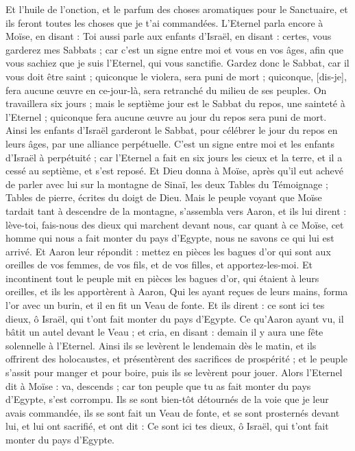 \begin{multicols}{2}
Et l'huile de l'onction, et le parfum des choses aromatiques pour le Sanctuaire, et ils feront toutes les choses que je t'ai commandées.
L'Eternel parla encore à Moïse, en disant :
Toi aussi parle aux enfants d'Israël, en disant : certes, vous garderez mes Sabbats ; car c'est un signe entre moi et vous en vos âges, afin que vous sachiez que je suis l'Eternel, qui vous sanctifie.
Gardez donc le Sabbat, car il vous doit être saint ; quiconque le violera, sera puni de mort ; quiconque, [dis-je], fera aucune œuvre en ce-jour-là, sera retranché du milieu de ses peuples.
On travaillera six jours ; mais le septième jour est le Sabbat du repos, une sainteté à l'Eternel ; quiconque fera aucune œuvre au jour du repos sera puni de mort.
Ainsi les enfants d'Israël garderont le Sabbat, pour célébrer le jour du repos en leurs âges, par une alliance perpétuelle.
C'est un signe entre moi et les enfants d'Israël à perpétuité ; car l'Eternel a fait en six jours les cieux et la terre, et il a cessé au septième, et s'est reposé.
Et Dieu donna à Moïse, après qu'il eut achevé de parler avec lui sur la montagne de Sinaï, les deux Tables du Témoignage ; Tables de pierre, écrites du doigt de Dieu.
\VerseOne{}Mais le peuple voyant que Moïse tardait tant à descendre de la montagne, s'assembla vers Aaron, et ils lui dirent : lève-toi, fais-nous des dieux qui marchent devant nous, car quant à ce Moïse, cet homme qui nous a fait monter du pays d'Egypte, nous ne savons ce qui lui est arrivé.
Et Aaron leur répondit : mettez en pièces les bagues d'or qui sont aux oreilles de vos femmes, de vos fils, et de vos filles, et apportez-les-moi.
Et incontinent tout le peuple mit en pièces les bagues d'or, qui étaient à leurs oreilles, et ils les apportèrent à Aaron,
Qui les ayant reçues de leurs mains, forma l'or avec un burin, et il en fit un Veau de fonte. Et ils dirent : ce sont ici tes dieux, ô Israël, qui t'ont fait monter du pays d'Egypte.
Ce qu'Aaron ayant vu, il bâtit un autel devant le Veau ; et cria, en disant : demain il y aura une fête solennelle à l'Eternel.
Ainsi ils se levèrent le lendemain dès le matin, et ils offrirent des holocaustes, et présentèrent des sacrifices de prospérité ; et le peuple s'assit pour manger et pour boire, puis ils se levèrent pour jouer.
Alors l'Eternel dit à Moïse : va, descends ; car ton peuple que tu as fait monter du pays d'Egypte, s'est corrompu.
Ils se sont bien-tôt détournés de la voie que je leur avais commandée, ils se sont fait un Veau de fonte, et se sont prosternés devant lui, et lui ont sacrifié, et ont dit : Ce sont ici tes dieux, ô Israël, qui t'ont fait monter du pays d'Egypte.

\end{multicols}
